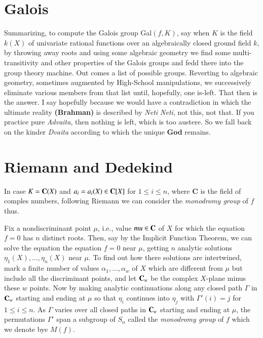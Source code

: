 \section{Galois}\label{chap1-sec3}

Summarizing, to compute the Galois group Gal$(f, K)$, say when $K$ is the field $k(X)$ of univariate rational functions over an algebraically closed ground field $k$, by throwing away roots and using some algebraic geometry we find some multi-transitivity and other properties of the Galois groups and fedd there into the group theory machine. Out comes a list of possible groups. Reverting to algebraic geometry, sometimes augmented by High-School manipulations, we successively eliminate various members from that list until, hopefully, one is-left. That then is the answer. I say hopefully because we would have a contradiction in which the ultimate reality {\bf (Brahman)} is described by {\it Neti Neti}, not this, not that. If you practice pure {\it Advaita}, then nothing is left, which is too austere. So we fall back on the kinder {\it Dvaita} according to which the unique {\bf God} remains. 

\section{Riemann and Dedekind}\label{chap1-sec4}

In case $K=\mathbf{C}(X)$ and $a_{i}=a_{i}(X)\in \mathbf{C}[X]$ for $1\leq i \leq n$, where {\bf C} is the field  of comples numbers, following Riemann \cite{chap1-key53} we can consider the {\it monodromy group} of $f$ thus.

Fix a nondiscriminant point $\mu$, i.e., value $mu \in \mathbf{C}$ of $X$ for which the equation $f=0$ has $n$ distinct roots. Then, say by the Implicit Function Theorem, we can solve the equation the equation $f=0$ near $\mu$, getting $n$ analytic solutions $\eta _{1}(X), \ldots, \eta _{n}(X)$ near $\mu$. To find out how there solutions are intertwined, mark a finite number of values $\alpha_{1}, \ldots, \alpha_{w}$ of $X$ which are different from $\mu$ but include all the discriminant points, and let $\mathbf{C}_{w}$ be the complex $X$-plane minus these $w$ points. Now by making analytic continuations along any closed path $\Gamma$ in $\mathbf{C}_{w}$ starting and ending at $\mu$ so that $\eta_{i}$ continues into $\eta_{j}$ with $\Gamma'(i)= j$ for $1 \leq i \leq n$. As $\Gamma$ varies over all closed paths in $\mathbf{C}_{w}$ starting and ending at $\mu$, the permutations $\Gamma'$ span a subgroup of $S_{n}$ called the {\it monodromy group} of  $f$ which we denote bye $M(f)$.   
 
